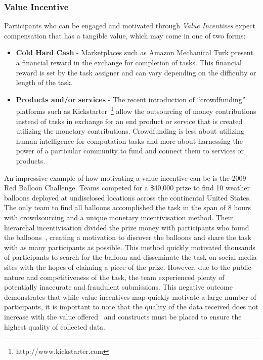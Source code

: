 \documentclass[10pt,twocolumn]{article}
\begin{document}
\subsubsection*{Value Incentive}

Participants who can be engaged and motivated through \textit{Value Incentives} 
expect compensation that has a tangible value, which may come in one of two
forms:

\begin{itemize}
	\item
		\textbf{Cold Hard Cash} - Marketplaces such as Amazon Mechanical Turk
		present a financial reward in the exchange for completion of tasks.
		This financial reward is set by the task assigner and can vary
		depending on the difficulty or length of the task.
	\item
		\textbf{Products and/or services} - The recent introduction of 
		``crowdfunding''~\cite{Howe2008,Belleflamme2011,Schwienbacher2010} platforms 
		such as Kickstarter~\footnote{http://www.kickstarter.com} allow the
		outsourcing of money contributions instead of tasks in exchange for an 
		end product or service that is created utilizing the monetary
		contributions. Crowdfunding is less about utilizing human intelligence
		for computation tasks and more about harnessing the power of a particular
		community to fund and connect them to services or products.
\end{itemize}

An impressive example of how motivating a value incentive can be is
the 2009 Red Balloon Challenge. Teams competed for a \$40,000 prize to find 
10 weather balloons deployed at undisclosed locations across the continental 
United States. The only team to find all balloons accomplished the task in the 
span of 8 hours with crowdsourcing and a unique monetary incentivisation method. 
Their hierarchal incentivisation divided the prize money with participants who 
found the balloons~\cite{Tang2011}, creating a motivation to discover the balloons 
and share the task with as many participants as possible. This method quickly 
motivated thousands of participants to search for the balloon and disseminate
the task on social media sites with the hopes of claiming a piece of the prize.
However, due to the public nature and competitiveness of the task, the team 
experienced plenty of potentially inaccurate and fraudulent submissions. This
negative outcome demonstrates that while value incentives map quickly motivate 
a large number of participants, it is important to note that the quality of 
the data received does not increase with the value offered~\cite{Mason2010a}
and constructs must be placed to ensure the highest quality of collected data.
\end{document}

